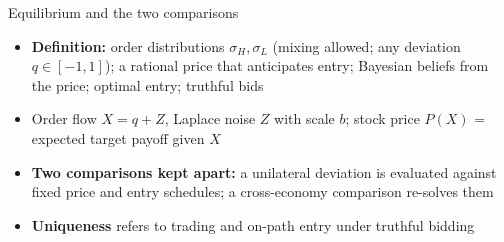 \documentclass[10pt,aspectratio=169]{beamer}
\newcommand{\NavGap}{\par\vspace{0.45cm}}%
\let\AdapterBackButton\BackButton
\renewcommand{\BackButton}[1]{\NavGap\AdapterBackButton{#1}}%
\begin{document}
\begin{frame}[label=A7]{Equilibrium and the two comparisons}
\hypertarget{app:eq}{}
\begin{itemize}\setlength{\itemsep}{6pt}
\item \textbf{Definition:} order distributions $\sigma_H,\sigma_L$ (mixing allowed; any deviation $q\in[-1,1]$); a rational price that anticipates entry; Bayesian beliefs from the price; optimal entry; truthful bids
\item Order flow $X=q+Z$, Laplace noise $Z$ with scale $b$; stock price $P(X)$ = expected target payoff given $X$
\item \textbf{Two comparisons kept apart:} a unilateral deviation is evaluated against fixed price and entry schedules; a cross-economy comparison re-solves them
\item \textbf{Uniqueness} refers to trading and on-path entry under truthful bidding
\end{itemize}
\end{frame}
\end{document}
